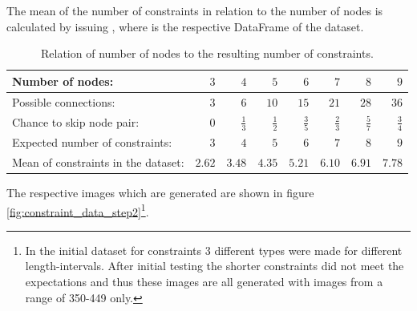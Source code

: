 The mean of the number of constraints in relation to the number of nodes is calculated by issuing , where  is the respective DataFrame of the dataset.

\begin{table}
\caption{Relation of number of nodes to the resulting number of constraints.}
\label{tab:relation_nodes_constraints}
\begin{tabular}{lrrrrrrr}
    \toprule
    Number of nodes: & $3$ & $4$ & $5$ & $6$ & $7$ & $8$ & $9$ \\
    \midrule
    Possible connections: & $3$ & $6$ & $10$ & $15$ & $21$ & $28$ & $36$ \\
    \midrule
    Chance to skip node pair: & $0$ & $\frac{1}{3}$ & $\frac{1}{2}$ & $\frac{3}{5}$ & $\frac{2}{3}$ & $\frac{5}{7}$ & $\frac{3}{4}$ \\
    \midrule
    Expected number of constraints: & $3$ & $4$ & $5$ & $6$ & $7$ & $8$ & $9$ \\
    \midrule
    Mean of constraints in the dataset: & $2.62$ & $3.48$ & $4.35$ & $5.21$ & $6.10$ & $6.91$ & $7.78$ \\
    \bottomrule
\end{tabular}
\end{table}

The respective images which are generated are shown in figure \ref{fig:constraint_data_step2}\footnote{In the initial dataset for constraints 3 different types were made for different length-intervals. After initial testing the shorter constraints did not meet the expectations and thus these images are all generated with images from a range of 350-449 only.}.

